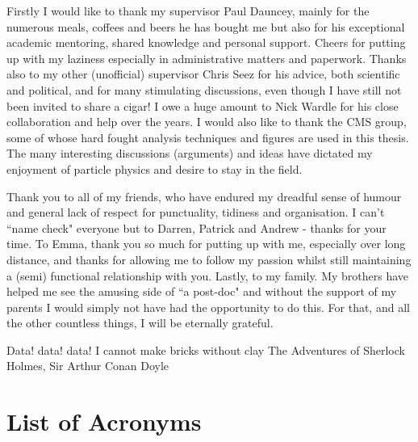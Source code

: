 \begin{acknowledgements}
  Firstly I would like to thank my supervisor Paul Dauncey, mainly for the numerous meals, coffees and beers he has bought me but also for his exceptional academic mentoring, shared knowledge and personal support. Cheers for putting up with my laziness especially in administrative matters and paperwork. Thanks also to my other (unofficial) supervisor Chris Seez for his advice, both scientific and political, and for many stimulating discussions, even though I have still not been invited to share a cigar! I owe a huge amount to Nick Wardle for his close collaboration and help over the years. I would also like to thank the CMS \Hgg group, some of whose hard fought analysis techniques and figures are used in this thesis. The many interesting discussions (arguments) and ideas have dictated my enjoyment of particle physics and desire to stay in the field.

  Thank you to all of my friends, who have endured my dreadful sense of humour and general lack of respect for punctuality, tidiness and organisation. I can't ``name check" everyone but to Darren, Patrick and Andrew - thanks for your time. To Emma, thank you so much for putting up with me, especially over long distance, and thanks for allowing me to follow my passion whilst still maintaining a (semi) functional relationship with you. Lastly, to my family. My brothers have helped me see the amusing side of ``a post-doc" and without the support of my parents I would simply not have had the opportunity to do this. For that, and all the other countless things, I will be eternally grateful. 

\end{acknowledgements}




\frontquote%
  {Data! data! data! I cannot make bricks without clay}
  {The Adventures of Sherlock Holmes, Sir Arthur Conan Doyle}

\tableofcontents
\listoffigures
\listoftables
\newpage
{}
\chapter*{List of Acronyms}


\newpage
\thispagestyle{empty}
\mbox{}
